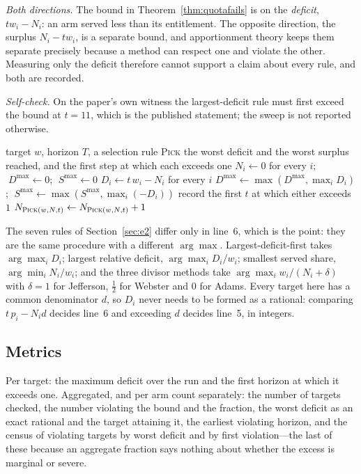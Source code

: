 \documentclass[conference]{IEEEtran}
\theoremstyle{definition}
\begin{document}
\emph{Both directions.} The bound in Theorem~\ref{thm:quotafails} is on the \emph{deficit},
$t w_{i}-N_{i}$: an arm served less than its entitlement. The opposite direction, the
surplus $N_{i}-t w_{i}$, is a separate bound, and apportionment theory keeps them separate
precisely because a method can respect one and violate the other. Measuring only the deficit
therefore cannot support a claim about every rule, and both are recorded.

\emph{Self-check.} On the paper's own witness the largest-deficit rule must first exceed the
bound at $t=11$, which is the published statement; the sweep is not reported otherwise.

\begin{algorithm}[htbp]
\caption{Online serving, with the rule as the only pluggable step}
\label{alg:online}
\begin{algorithmic}[1]
\REQUIRE target $w$, horizon $T$, a selection rule \textsc{Pick}
\ENSURE the worst deficit and the worst surplus reached, and the first step at which each
        exceeds one
\STATE $N_{i}\leftarrow0$ for every $i$; $\;D^{\max}\leftarrow0$; $\;S^{\max}\leftarrow0$
  \STATE $D_{i}\leftarrow t\,w_{i}-N_{i}$ for every $i$
  \STATE $D^{\max}\leftarrow\max(D^{\max},\max_{i}D_{i})$;
         $\;S^{\max}\leftarrow\max(S^{\max},\max_{i}(-D_{i}))$
  \STATE record the first $t$ at which either exceeds $1$
    \STATE $N_{\textsc{Pick}(w,N,t)}\leftarrow N_{\textsc{Pick}(w,N,t)}+1$
  \ENDIF
\ENDFOR
\end{algorithmic}
\end{algorithm}

\noindent The seven rules of Section~\ref{sec:e2} differ only in line~6, which is the point:
they are the same procedure with a different $\arg\max$. Largest-deficit-first takes
$\arg\max_{i}D_{i}$; largest relative deficit, $\arg\max_{i}D_{i}/w_{i}$; smallest served
share, $\arg\min_{i}N_{i}/w_{i}$; and the three divisor methods take
$\arg\max_{i}w_{i}/(N_{i}+\delta)$ with $\delta=1$ for Jefferson, $\tfrac12$ for Webster and
$0$ for Adams. Every target here has a common denominator $d$, so $D_{i}$ never needs to be
formed as a rational: comparing $t\,p_{i}-N_{i}d$ decides line~6 and exceeding $d$ decides
line~5, in integers.

\subsection{Metrics}

Per target: the maximum deficit over the run and the first horizon at which it exceeds one.
Aggregated, and per arm count separately: the number of targets checked, the number violating
the bound and the fraction, the worst deficit as an exact rational and the target attaining
it, the earliest violating horizon, and the census of violating targets by worst deficit and
by first violation---the last of these because an aggregate fraction says nothing about
whether the excess is marginal or severe.
\end{document}

